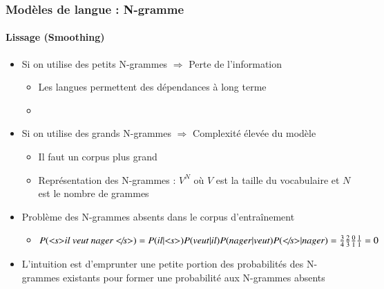 \documentclass[xcolor=table]{beamer}
\begin{document}
\begin{frame}
\frametitle{Modèles de langue : N-gramme}
\framesubtitle{Lissage (Smoothing)}

\begin{itemize}
	
	\item Si on utilise des petits N-grammes $ \Longrightarrow $ Perte de l'information
	\begin{itemize}
		\item Les langues permettent des dépendances à long terme
		\item {}
	\end{itemize}

	\item Si on utilise des grands N-grammes $ \Longrightarrow $ Complexité élevée du modèle
	\begin{itemize}
		\item Il faut un corpus plus grand
		\item Représentation des N-grammes : $V^N$ où $V$ est la taille du vocabulaire et $N$ est le nombre de grammes
	\end{itemize}

	\item Problème des N-grammes absents dans le corpus d'entraînement
	\begin{itemize}
		\item $P(\text{\textit{\textless s\textgreater il veut nager \textless/s\textgreater}}) = 
		P(il|\text{\textit{\textless s\textgreater}}) P(veut|il) P(nager|veut)  P(\text{\textit{\textless/s\textgreater}}|nager) = 
		\frac{3}{4} \frac{2}{3} \frac{0}{1} \frac{1}{1} = 0
		$
	\end{itemize}
	\item L'intuition est d'emprunter une petite portion des probabilités des N-grammes existants pour former une probabilité aux N-grammes absents 
\end{itemize}

\end{frame}
\end{document}
